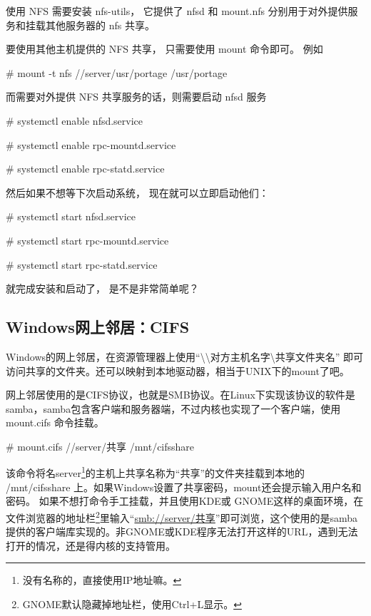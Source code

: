 使用 NFS 需要安装 nfs-utils， 它提供了 nfsd 和 mount.nfs 分别用于对外提供服务和挂载其他服务器的 nfs 共享。

要使用其他主机提供的 NFS 共享， 只需要使用 mount 命令即可。 例如 

\begin{code}
\# mount -t nfs //server/usr/portage	/usr/portage
\end{code}

而需要对外提供 NFS 共享服务的话，则需要启动 nfsd 服务

\begin{code}
\# systemctl enable nfsd.service

\# systemctl enable rpc-mountd.service

\# systemctl enable rpc-statd.service
\end{code}

然后如果不想等下次启动系统， 现在就可以立即启动他们：

\begin{code}
\# systemctl start nfsd.service

\# systemctl start rpc-mountd.service

\# systemctl start rpc-statd.service
\end{code}

就完成安装和启动了， 是不是非常简单呢？

\subsection{Windows网上邻居：CIFS}\label{sec:fscifs}

Windows的网上邻居，在资源管理器上使用``\textbackslash{}\textbackslash{}对方主机名字\textbackslash{}共享文件夹名'' 即可访问共享的文件夹。还可以映射到本地驱动器，相当于UNIX下的mount了吧。

网上邻居使用的是CIFS协议，也就是SMB协议。在Linux下实现该协议的软件是samba，samba包含客户端和服务器端，不过内核也实现了一个客户端，使用 mount.cifs 命令挂载。

\begin{code}
\# mount.cifs //server/共享	 /mnt/cifsshare
\end{code}

该命令将名server\footnote{没有名称的，直接使用IP地址嘛。}的主机上共享名称为“共享”的文件夹挂载到本地的 /mnt/cifsshare 上。如果Windows设置了共享密码，mount还会提示输入用户名和密码。
如果不想打命令手工挂载，并且使用KDE或 GNOME这样的桌面环境，在文件浏览器的地址栏\footnote{GNOME默认隐藏掉地址栏，使用Ctrl+L显示。}里输入``\url{smb://server/共享}''即可浏览，这个使用的是samba提供的客户端库实现的。非GNOME或KDE程序无法打开这样的URL，遇到无法打开的情况，还是得内核的支持管用。

